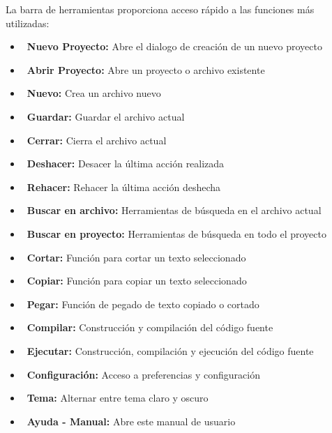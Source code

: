 \documentclass[../../main.tex]{subfiles}
\begin{document}
\par{La barra de herramientas proporciona acceso rápido a las funciones más utilizadas:}

\begin{itemize}

    \item \faFolderPlus\ \textbf{Nuevo Proyecto:} Abre el dialogo de creación de un nuevo proyecto
    \item \faFolderOpen\ \textbf{Abrir Proyecto:} Abre un proyecto o archivo existente
    \item \faFile\ \textbf{Nuevo:} Crea un archivo nuevo
    \item \faSave\ \textbf{Guardar:} Guardar el archivo actual
    \item \faTimes\ \textbf{Cerrar:} Cierra el archivo actual
    
    \item \faUndo\ \textbf{Deshacer:} Desacer la última acción realizada
    \item \faRedo\ \textbf{Rehacer:} Rehacer la última acción deshecha
    \item \faSearch\ \textbf{Buscar en archivo:} Herramientas de búsqueda en el archivo actual
    \item \faSearchPlus\ \textbf{Buscar en proyecto:} Herramientas de búsqueda en todo el proyecto

    \item \faCut\ \textbf{Cortar:} Función para cortar un texto seleccionado
    \item \faCopy\ \textbf{Copiar:} Función para copiar un texto seleccionado
    \item \faPaste\ \textbf{Pegar:} Función de pegado de texto copiado o cortado
    
    \item \faHammer\ \textbf{Compilar:} Construcción y compilación del código fuente
    \item \faPlay\ \textbf{Ejecutar:} Construcción, compilación y ejecución del código fuente

    \item \faCog\ \textbf{Configuración:} Acceso a preferencias y configuración
    \item \faAdjust\ \textbf{Tema:} Alternar entre tema claro y oscuro
    
    \item \faQuestionCircle\ \textbf{Ayuda - Manual:} Abre este manual de usuario
\end{itemize}
\end{document}
